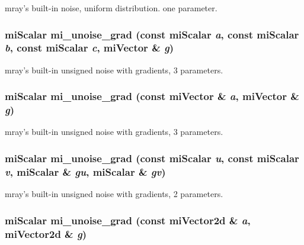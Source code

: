 mray's built-in noise, uniform distribution. one parameter. 

\subsubsection{\setlength{\rightskip}{0pt plus 5cm}mi\-Scalar mi\_\-unoise\_\-grad (const mi\-Scalar {\em a}, const mi\-Scalar {\em b}, const mi\-Scalar {\em c}, mi\-Vector \& {\em g})\hspace{0.3cm}{\tt  [inline]}}\label{namespacersl_a123}


mray's built-in unsigned noise with gradients, 3 parameters. 

\subsubsection{\setlength{\rightskip}{0pt plus 5cm}mi\-Scalar mi\_\-unoise\_\-grad (const mi\-Vector \& {\em a}, mi\-Vector \& {\em g})\hspace{0.3cm}{\tt  [inline]}}\label{namespacersl_a122}


mray's built-in unsigned noise with gradients, 3 parameters. 

\subsubsection{\setlength{\rightskip}{0pt plus 5cm}mi\-Scalar mi\_\-unoise\_\-grad (const mi\-Scalar {\em u}, const mi\-Scalar {\em v}, mi\-Scalar \& {\em gu}, mi\-Scalar \& {\em gv})\hspace{0.3cm}{\tt  [inline]}}\label{namespacersl_a121}


mray's built-in unsigned noise with gradients, 2 parameters. 

\subsubsection{\setlength{\rightskip}{0pt plus 5cm}mi\-Scalar mi\_\-unoise\_\-grad (const mi\-Vector2d \& {\em a}, mi\-Vector2d \& {\em g})\hspace{0.3cm}{\tt  [inline]}}\label{namespacersl_a120}


